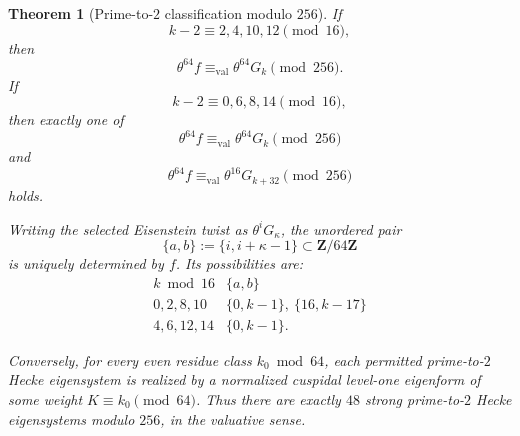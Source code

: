 \documentclass[11pt]{article}
\theoremstyle{plain}
\newtheorem{theorem}{Theorem}[section]
\theoremstyle{definition}
\theoremstyle{remark}
\numberwithin{equation}{section}
\begin{document}
\begin{theorem}[Prime-to-\(2\) classification modulo \(256\)] \label{thm:intro-p2} If \[ k-2\equiv2,4,10,12\pmod{16}, \] then \[ \theta^{64}f \equiv_{\mathrm{val}} \theta^{64}G_k\pmod{256}. \] If \[ k-2\equiv0,6,8,14\pmod{16}, \] then exactly one of \[ \theta^{64}f \equiv_{\mathrm{val}} \theta^{64}G_k\pmod{256} \] and \[ \theta^{64}f \equiv_{\mathrm{val}} \theta^{16}G_{k+32}\pmod{256} \] holds.

Writing the selected Eisenstein twist as \(\theta^iG_\kappa\), the unordered pair \[ \{a,b\}:=\{i,i+\kappa-1\}\subset\mathbf Z/64\mathbf Z \] is uniquely determined by \(f\). Its possibilities are:
\[
\begin{array}{c|l}
k\bmod16 & \{a,b\}\\ \hline
0,2,8,10 & \{0,k-1\},\ \{16,k-17\}\\
4,6,12,14 & \{0,k-1\}.
\end{array}
\]

Conversely, for every even residue class \(k_0\bmod64\), each permitted prime-to-\(2\) Hecke eigensystem is realized by a normalized cuspidal level-one eigenform of some weight \(K\equiv k_0\pmod{64}\). Thus there are exactly \(48\) strong prime-to-\(2\) Hecke eigensystems modulo \(256\), in the valuative sense.
\end{theorem}
\end{document}
